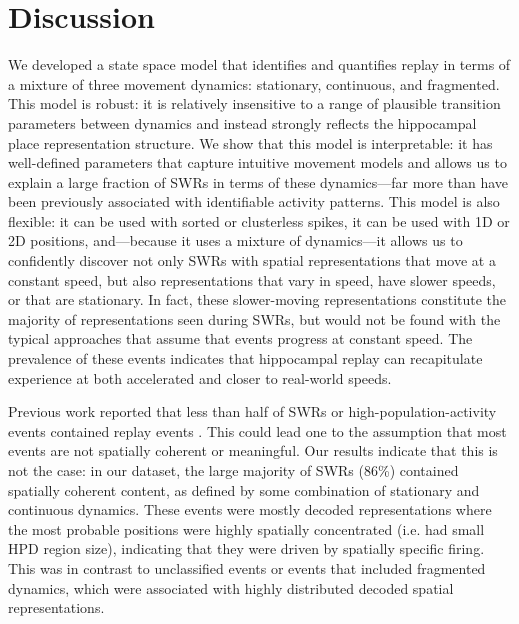 \documentclass[9pt,lineno]{elife}
\begin{document}
\section*{Discussion}
We developed a state space model that identifies and quantifies replay in terms of a mixture of three movement dynamics: stationary, continuous, and fragmented. This model is robust: it is relatively insensitive to a range of plausible transition parameters between dynamics and instead strongly reflects the hippocampal place representation structure. We show that this model is interpretable: it has well-defined parameters that capture intuitive movement models and allows us to explain a large fraction of SWRs in terms of these dynamics---far more than have been previously associated with identifiable activity patterns. This model is also flexible: it can be used with sorted or clusterless spikes, it can be used with 1D or 2D positions, and---because it uses a mixture of dynamics---it allows us to confidently discover not only SWRs with spatial representations that move at a constant speed, but also representations that vary in speed, have slower speeds, or that are stationary. In fact, these slower-moving representations constitute the majority of representations seen during SWRs, but would not be found with the typical approaches that assume that events progress at constant speed. The prevalence of these events indicates that hippocampal replay can recapitulate experience at both accelerated and closer to real-world speeds.

Previous work reported that less than half of SWRs or high-population-activity events contained replay events \citep{FosterReversereplaybehavioural2006, KarlssonAwakereplayremote2009, DavidsonHippocampalReplayExtended2009}. This could lead one to the assumption that most events are not spatially coherent or meaningful. Our results indicate that this is not the case: in our dataset, the large majority of SWRs (86\%) contained spatially coherent content, as defined by some combination of stationary and continuous dynamics. These events were mostly decoded representations where the most probable positions were highly spatially concentrated (i.e. had small HPD region size), indicating that they were driven by spatially specific firing. This was in contrast to unclassified events or events that included fragmented dynamics, which were associated with highly distributed decoded spatial representations.
\end{document}
